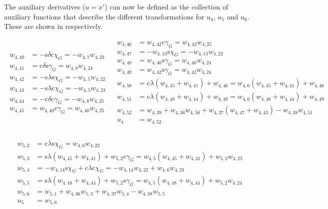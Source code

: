 \noindent
The auxiliary derivatives ($u = x'$) can now be defined as the collection of auxiliary functions that describe the different transformations for $u_{4}$, $u_{5}$ and $u_{6}$. These are shown in  respectively. 

\begin{align} \label{eq:u4AuxF}
\begin{split}
w_{4,40} &= -\text{s}\delta \text{c}\chi_{G} = -w_{4,7}w_{4,23} \\
w_{4,41} &= \text{c}\delta	\text{s}\gamma_{G} = w_{4,8}w_{4,24}\\
w_{4,42} &= -\text{s}\lambda \text{s}\chi_{G} = -w_{4,5}w_{4,22}\\
w_{4,43} &= -\text{s}\lambda \text{c}\chi_{G} = -w_{4,5}w_{4,23} \\
w_{4,44} &= -\text{c}\delta \text{c}\gamma_{G} = -w_{4,8}w_{4,25} \\
w_{4,45} &= w_{4,40} \text{c}\gamma_{G} = w_{4,40}w_{4,25} \\
\end{split}
&
\begin{split}
w_{4,46} &= w_{4,42} \text{c}\gamma_{G} = w_{4,42}w_{4,25} \\
w_{4,47} &= -w_{4,13} \text{s}\chi_{G} = -w_{4,13}w_{4,22} \\
w_{4,48} &= w_{4,40} \text{s}\gamma_{G} = w_{4,40}w_{4,24} \\
w_{4,49} &= w_{4,42} \text{s}\gamma_{G} = w_{4,42}w_{4,24} \\
w_{4,50} &= \text{c}\lambda \left(w_{4,45}+w_{4,41} \right) + w_{4,46} = 
w_{4,6}\left(w_{4,45}+w_{4,41} \right) + w_{4,46} \\
w_{4,51} &= \text{c}\lambda \left(w_{4,48}+w_{4,44} \right) + w_{4,49} =
w_{4,6}\left(w_{4,48}+w_{4,44} \right) + w_{4,49} \\
w_{4,52} &= w_{4,39} +w_{4,36}w_{4,50}+w_{4,37}\left(w_{4,47}+w_{4,43}\right)-w_{4,38}w_{4,51} \\
u_{4} &= w_{4,52} \\
\end{split}
\end{align}

\begin{align} \label{eq:u5AuxF}
\begin{split}
w_{5,2} &= \text{c}\lambda \text{s}\chi_{G} = w_{4,6}w_{4,22} \\
w_{5,3} &= \text{s}\lambda \left(w_{4,45}+w_{4,41}\right)+w_{5,2} \text{c}\gamma_{G} = w_{4,5} \left(w_{4,45}+w_{4,41}\right) +w_{5,2} w_{4,25} \\
w_{5,4} &= -w_{4,14} \text{s}\chi_{G}+\text{c}\lambda \text{c}\chi_{G} = -w_{4,14}w_{4,22}+w_{4,6}w_{4,23} \\
w_{5,5} &= \text{s}\lambda \left(w_{4,48}+w_{4,44}\right) + w_{5,2} \text{s}\gamma_{G} = w_{4,5} \left(w_{4,48}+w_{4,44}\right)+w_{5,2}w_{4,24} \\
w_{5,6} &= w_{5,1} + w_{4,36}w_{5,3}+w_{4,37}w_{5,4}-w_{4,38}w_{5,5} \\
u_{5} &= w_{5,6} \\
\end{split}
\end{align}

